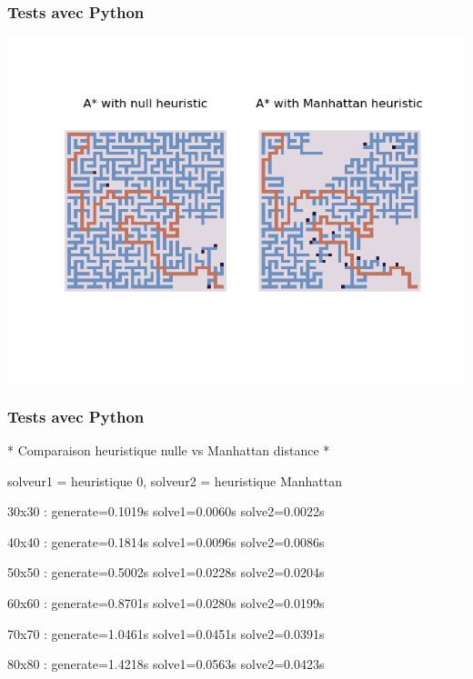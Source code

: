 \documentclass[]{beamer}
\begin{document}
\begin{frame}
  \frametitle{Tests avec Python}
  \includegraphics[width=.9\linewidth]{manhattan_vs_null.png}
\end{frame}

\begin{frame}
  \frametitle{Tests avec Python}
  \begin{semiverbatim}
    * Comparaison heuristique nulle vs Manhattan distance *
    
    solveur1 = heuristique 0, solveur2 = heuristique Manhattan
    
    30x30  : generate=0.1019s solve1=0.0060s solve2=0.0022s
    
    40x40  : generate=0.1814s solve1=0.0096s solve2=0.0086s
    
    50x50  : generate=0.5002s solve1=0.0228s solve2=0.0204s
    
    60x60  : generate=0.8701s solve1=0.0280s solve2=0.0199s
    
    70x70  : generate=1.0461s solve1=0.0451s solve2=0.0391s
    
    80x80  : generate=1.4218s solve1=0.0563s solve2=0.0423s
  \end{semiverbatim}
\end{frame}
\end{document}
